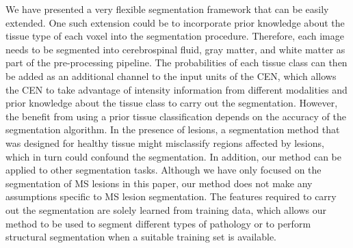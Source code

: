 
We have presented a very flexible segmentation framework that can be easily
extended. One such extension could be to incorporate prior knowledge about the
tissue type of each voxel into the segmentation procedure. Therefore, each image
needs to be segmented into cerebrospinal fluid, gray matter, and white matter as
part of the pre-processing pipeline. The probabilities of each tissue class can
then be added as an additional channel to the input units of the CEN, which
allows the CEN to take advantage of intensity information from different
modalities and prior knowledge about the tissue class to carry out the
segmentation.
%
%
However, the benefit from using a prior tissue classification depends on the
accuracy of the segmentation algorithm. In the presence of lesions, a
segmentation method that was designed for healthy tissue might misclassify
regions affected by lesions, which in turn could confound the segmentation. In
addition, our method can be applied to other segmentation tasks. Although we
have only focused on the segmentation of MS lesions in this paper, our method
does not make any assumptions specific to MS lesion segmentation. The features
required to carry out the segmentation are solely learned from training data,
which allows our method to be used to segment different types of pathology or to
perform structural segmentation when a suitable training set is available.

